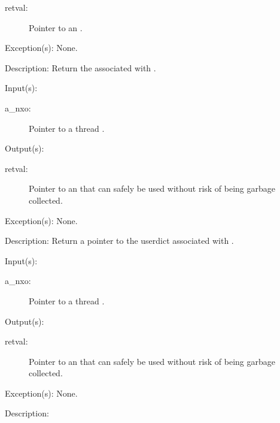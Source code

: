 \begin{capi}
\begin{capilist}
\begin{description}
		\item[retval: ]
			Pointer to an .
		\end{description}
	\item[Exception(s): ] None.
	\item[Description: ]
		Return the  associated with .
	\end{capilist}
\label{nxo_thread_userdict_get}
	\begin{capilist}
	\item[Input(s): ]
		\begin{description}\item[]
		\item[a\_nxo: ]
			Pointer to a thread .
		\end{description}
	\item[Output(s): ]
		\begin{description}\item[]
		\item[retval: ]
			Pointer to an  that can safely be used
			without risk of being garbage collected.
		\end{description}
	\item[Exception(s): ] None.
	\item[Description: ]
		Return a pointer to the userdict associated with .
	\end{capilist}
\label{nxo_thread_errordict_get}
	\begin{capilist}
	\item[Input(s): ]
		\begin{description}\item[]
		\item[a\_nxo: ]
			Pointer to a thread \classname{nxo}.
		\end{description}
	\item[Output(s): ]
		\begin{description}\item[]
		\item[retval: ]
			Pointer to an  that can safely be used
			without risk of being garbage collected.
		\end{description}
	\item[Exception(s): ] None.
	\item[Description: ]

\end{capilist}
\end{capi}
